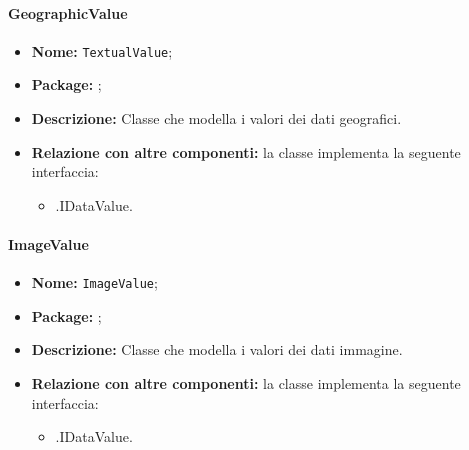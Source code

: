 \paragraph{GeographicValue}
\begin{itemize}
\item \textbf{Nome:} \texttt{TextualValue};
\item \textbf{Package:} \texttt{\smodel{}};
\item \textbf{Descrizione:} Classe che modella i valori dei dati geografici.
\item \textbf{Relazione con altre componenti:} la classe implementa la seguente interfaccia:
		\begin{itemize}
			\item \smodel{}.IDataValue.
		\end{itemize}
\end{itemize}

\paragraph{ImageValue}
\begin{itemize}
\item \textbf{Nome:} \texttt{ImageValue};
\item \textbf{Package:} \texttt{\smodel{}};
\item \textbf{Descrizione:} Classe che modella i valori dei dati immagine.
\item \textbf{Relazione con altre componenti:} la classe implementa la seguente interfaccia:
		\begin{itemize}
			\item \smodel{}.IDataValue.
		\end{itemize}
\end{itemize}
